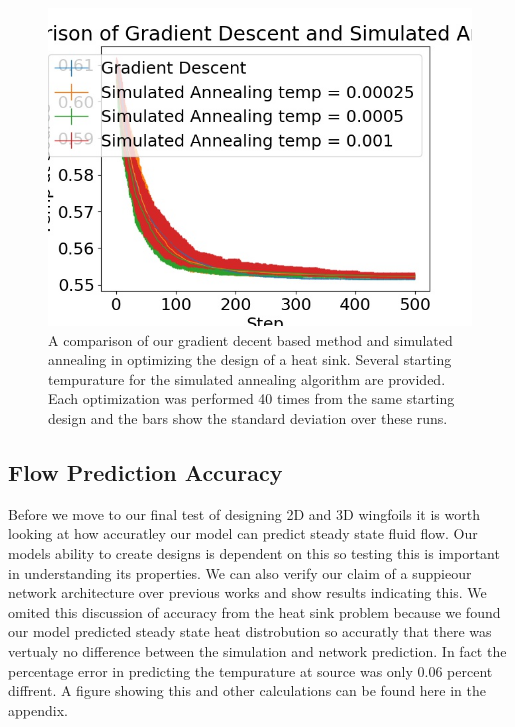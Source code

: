 \documentclass{article} %
\begin{document}
\begin{figure}[h]
\begin{center}
\includegraphics[scale=0.30]{../test/figs/heat_learn_comparison.jpeg}
\end{center}
\caption{A comparison of our gradient decent based method and simulated annealing in optimizing the design of a heat sink. Several starting tempurature for the simulated annealing algorithm are provided. Each optimization was performed 40 times from the same starting design and the bars show the standard deviation over these runs.}
\end{figure}


\subsection{Flow Prediction Accuracy}

Before we move to our final test of designing 2D and 3D wingfoils it is worth looking at how accuratley our model can predict steady state fluid flow. Our models ability to create designs is dependent on this so testing this is important in understanding its properties. We can also verify our claim of a suppieour network architecture over previous works and show results indicating this. We omited this discussion of accuracy from the heat sink problem because we found our model predicted steady state heat distrobution so accuratly that there was vertualy no difference between the simulation and network prediction. In fact the percentage error in predicting the tempurature at source was only 0.06 percent diffrent. A figure showing this and other calculations can be found here in the appendix.
\end{document}
